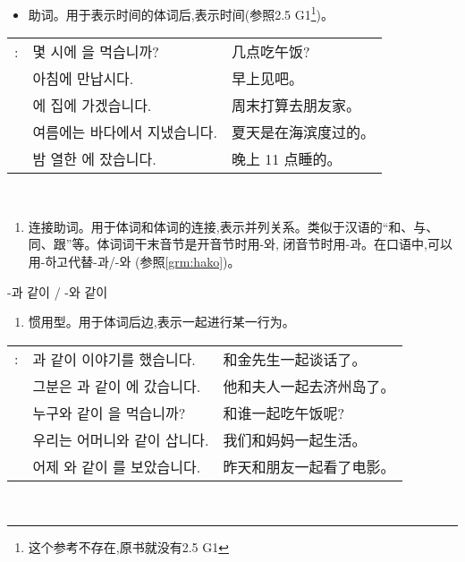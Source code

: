 \begin{grammar}
	\begin{grammarsect}[-에]
		\begin{itemize}
			\item 助词。用于表示时间的体词后,表示时间(参照2.5 G1\footnote{这个参考不存在,原书就没有2.5 G1})。\\
		\end{itemize}
		\begin{tabular}{lll}
			\kr \ruby{例}{예}: &\kr 몇 시에 \ruby{點心}{점심}을 먹습니까?              & 几点吃午饭?     \\
			             & \kr 아침에 만납시다.                              & 早上见吧。      \\
			             & \kr \ruby{週末}{주말}에 \ruby{親舊}{친구} 집에 가겠습니다. & 周末打算去朋友家。  \\
			             & \kr 여름에는 바다에서 지냈습니다.                       & 夏天是在海滨度过的。 \\
			             & \kr 밤 열한 \ruby{時}{시}에 잤습니다.                & 晚上 11 点睡的。
		\end{tabular}\\
	\end{grammarsect}
	\begin{grammarsect}[-과 / -와]\label{grm:ua}
		\begin{enumerate}
			\item 连接助词。用于体词和体词的连接,表示并列关系。类似于汉语的“和、与、同、跟”等。体词词干末音节是开音节时用-와, 闭音节时用-과。在口语中,可以用-하고代替-과/-와 (参照\ref{grm:hako})。
		\end{enumerate}
		{\large \HandRight -과 같이 / -와 같이\\}
		\begin{enumerate}
			\item 惯用型。用于体词后边,表示一起进行某一行为。\\
		\end{enumerate}
		\begin{tabular}{lll}
			\kr \ruby{例}{예}: &\kr \ruby{金}{김} \ruby{先生}{선생}과 같이 이야기를 했습니다. &和金先生一起谈话了。\\
			&\kr 그분은 \ruby{夫人}{부인}과 같이 \ruby{濟州島}{제주도}에 갔습니다. &他和夫人一起去济州岛了。 \\
			&\kr 누구와 같이 \ruby{點心}{점심}을 먹습니까?&和谁一起吃午饭呢? \\
			&\kr 우리는 어머니와 같이 삽니다.&我们和妈妈一起生活。\\
			&\kr 어제 \ruby{親舊}{친구}와 같이 \ruby{映畫}{영화}를 보았습니다.&昨天和朋友一起看了电影。\\
	\end{tabular}\\
	\end{grammarsect}
\end{grammar}
